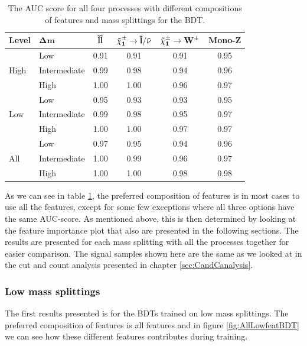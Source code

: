 \begin{table}[H]
    \centering
    \renewcommand{\arraystretch}{1.}
    \begin{tabular}{l l c c c c }
    \toprule
    \textbf{Level} & $\mathbf{\Delta m}$ & $\mathbf{\Tilde{l} \Tilde{l}}$ & $\mathbf{\Tilde{\chi}_1^\pm \rightarrow \Tilde{l}/\Tilde{\nu}}$ & $\mathbf{\Tilde{\chi}_1^\pm \rightarrow W^\pm}$ & \textbf{Mono-Z}  \\
    \midrule
    \midrule
    \multirow{3}{*}{High} &  Low   & 0.91 & 0.91 & 0.91 & 0.95 \\
     & Intermediate & 0.99 & 0.98 & 0.94 & 0.96 \\
     & High & 1.00 & 1.00 & 0.96 & 0.97 \\
     \midrule
    \multirow{3}{*}{Low} & Low & 0.95 & 0.93 & 0.93 & 0.95 \\
     & Intermediate & 0.99 & 0.98 & 0.95 & 0.97 \\
     & High & 1.00 & 1.00 & 0.97 & 0.97 \\
     \midrule
    \multirow{3}{*}{All} & Low & 0.97 & 0.95 & 0.94 & 0.96 \\
     & Intermediate & 1.00 & 0.99 & 0.96 & 0.97 \\
     & High & 1.00 & 1.00 & 0.98 & 0.98 \\
     \bottomrule
    \end{tabular}
    \caption{The AUC score for all four processes with different compositions of features and mass splittings for the BDT.}
    \label{tab:AUCBDT}
\end{table}


As we can see in table \ref{tab:AUCBDT}, the preferred composition of features is in most cases to use all the features, except for some few exceptions where all three options have the same AUC-score. As mentioned above, this is then determined by looking at the feature importance plot that also are presented in the following sections. The results are presented for each mass splitting with all the processes together for easier comparison. The signal samples shown here are the same as we looked at in the cut and count analysis presented in chapter \ref{sec:CandCanalysis}.
















\subsubsection{Low mass splittings}
The first results presented is for the BDTs trained on low mass splittings. The preferred composition of features is all features and in figure \ref{fig:AllLowfeatBDT} we can see how these different features contributes during training. 


